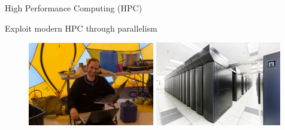 \documentclass[hide notes,intlimits]{beamer}
\begin{document}
\begin{frame}{High Performance Computing (HPC)}
  \begin{block}{Exploit modern HPC through parallelism}
    \begin{figure}
      \includegraphics[width=5.5cm]{jason-parallel}
      \hfill
      \includegraphics[width=5.5cm]{bw_front_sm}
    \end{figure}
  \end{block}
\end{frame}
\end{document}
